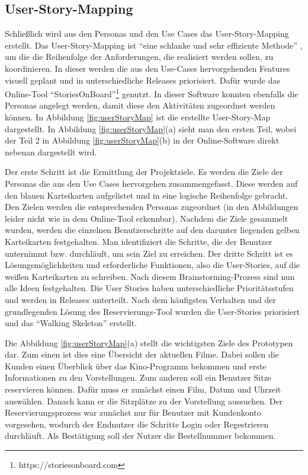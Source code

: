 	\subsection{User-Story-Mapping}
	Schließlich wird aus den Personas und den Use Cases das User-Story-Mapping erstellt. Das User-Story-Mapping ist \enquote{eine schlanke und sehr effiziente Methode} \autocite[][S. 143]{userStory}, um die die Reihenfolge der Anforderungen, die realisiert werden sollen, zu koordinieren. In dieser werden die aus den Use-Cases hervorgehenden Features visuell geplant und in unterschiedliche Releases priorisiert. Dafür wurde das Online-Tool \enquote{StoriesOnBoard}\footnote{https://storiesonboard.com} genutzt. In dieser Software konnten ebenfalls die Personas angelegt werden, damit diese den Aktivitäten zugeordnet werden können. In Abbildung \vref{fig:userStoryMap} ist die erstellte User-Story-Map dargestellt. In Abbildung \ref{fig:userStoryMap}(a) sieht man den ersten Teil, wobei der Teil 2 in Abbildung \ref{fig:userStoryMap}(b) in der Online-Software direkt nebenan dargestellt wird. 
	
	Der erste Schritt ist die Ermittlung der Projektziele. Es werden die Ziele der Personas die aus den Use Cases hervorgehen zusammengefasst. Diese werden auf den blauen Karteikarten aufgelistet und in eine logische Reihenfolge gebracht. Den Zielen werden die entsprechenden Personas zugeordnet (in den Abbildungen leider nicht wie in dem Online-Tool erkennbar). Nachdem die Ziele gesammelt wurden, werden die einzelnen Benutzerschritte auf den darunter liegenden gelben Karteikarten festgehalten. Man identifiziert die Schritte, die der Benutzer unternimmt bzw. durchläuft, um sein Ziel zu erreichen. Der dritte Schritt ist es Lösungsmöglichkeiten und erforderliche Funktionen, also die User-Stories, auf die weißen Karteikarten zu schreiben. Nach diesem Brainstorming-Prozess sind nun alle Ideen festgehalten. Die User Stories haben unterschiedliche Prioritätsstufen und werden in Releases unterteilt. Nach dem häufigsten Verhalten und der grundlegenden Lösung des Reservierungs-Tool wurden die User-Stories priorisiert und das \enquote{Walking Skeleton} erstellt. 
	
	 Die Abbildung \ref{fig:userStoryMap}(a) stellt die wichtigsten Ziele des Prototypen dar. Zum einen ist dies eine Übersicht der aktuellen Filme. Dabei sollen die Kunden einen Überblick über das Kino-Programm bekommen und erste Informationen zu den Vorstellungen. Zum anderen soll ein Benutzer Sitze reservieren können. Dafür muss er zunächst einen Film, Datum und Uhrzeit auswählen. Danach kann er die Sitzplätze zu der Vorstellung aussuchen. Der Reservierungsprozess war zunächst nur für Benutzer mit Kundenkonto vorgesehen, wodurch der Endnutzer die Schritte Login oder Regestrieren durchläuft. Als Bestätigung soll der Nutzer die Bestellnummer bekommen. 
	 
